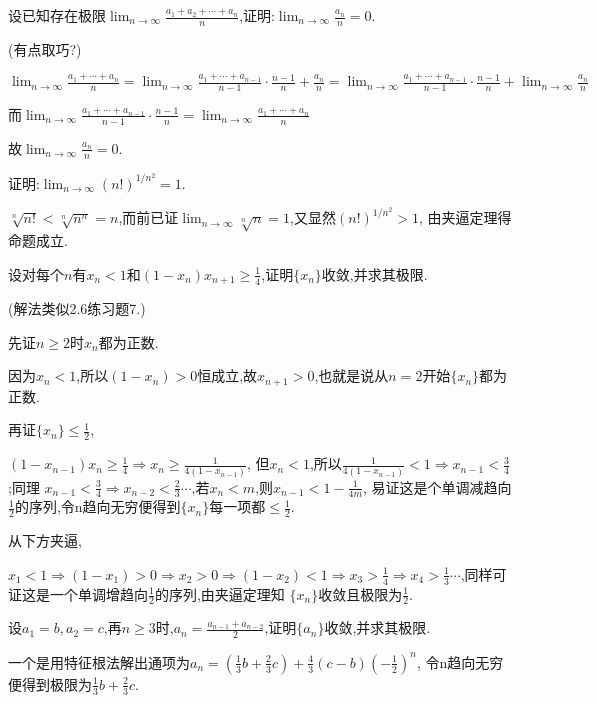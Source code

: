 \documentclass{exam}
\begin{document}
\begin{questions}
    \question
    设已知存在极限$\lim_{n\to\infty}\frac{a_1+a_2+\cdots+a_n}{n}$,证明:$\lim_{n\to\infty}\frac{a_n}{n}=0$.
    \begin{solution}
        (有点取巧?)

        $\lim_{n\to\infty}\frac{a_1+\cdots+a_n}{n}=
        \lim_{n\to\infty}\frac{a_1+\cdots+a_{n-1}}{n-1}\cdot\frac{n-1}{n}+\frac{a_n}{n}=
        \lim_{n\to\infty}\frac{a_1+\cdots+a_{n-1}}{n-1}\cdot\frac{n-1}{n}+\lim_{n\to\infty}\frac{a_n}{n}$

        而$\lim_{n\to\infty}\frac{a_1+\cdots+a_{n-1}}{n-1}\cdot\frac{n-1}{n}=\lim_{n\to\infty}\frac{a_1+\cdots+a_n}{n}$

        故$\lim_{n\to\infty}\frac{a_n}{n}=0$.
    \end{solution}

    \question
    证明:$\lim_{n\to\infty}(n!)^{1/n^2}=1$.
    \begin{solution}
        $\sqrt[n]{n!}<\sqrt[n]{n^n}=n$,而前已证$\lim_{n\to\infty}\sqrt[n]{n}=1$,又显然$(n!)^{1/n^2}>1$,
        由夹逼定理得命题成立.
    \end{solution}

    \question
    设对每个$n$有$x_n<1$和$(1-x_n)x_{n+1}\geqslant\frac{1}{4}$,证明$\{x_n\}$收敛,并求其极限.
    \begin{solution}
        (解法类似2.6练习题7.)
        
        先证$n\geqslant2$时$x_n$都为正数.

        因为$x_n<1$,所以$(1-x_n)>0$恒成立,故$x_{n+1}>0$,也就是说从$n=2$开始$\{x_n\}$都为正数.

        再证$\{x_n\}\leqslant\frac{1}{2}$,

        $(1-x_{n-1})x_n\geqslant\frac{1}{4}\Rightarrow x_n\geqslant\frac{1}{4(1-x_{n-1})}$,
        但$x_n<1$,所以$\frac{1}{4(1-x_{n-1})}<1\Rightarrow x_{n-1}<\frac{3}{4}$;同理
        $x_{n-1}<\frac{3}{4}\Rightarrow x_{n-2}<\frac{2}{3}\cdots$,若$x_n<m$,则$x_{n-1}<1-\frac{1}{4m}$,
        易证这是个单调减趋向$\frac{1}{2}$的序列,令n趋向无穷便得到$\{x_n\}$每一项都$\leqslant\frac{1}{2}$.

        从下方夹逼,
        
        $x_1<1\Rightarrow(1-x_1)>0\Rightarrow x_2>0\Rightarrow(1-x_2)<1\Rightarrow x_3>\frac{1}{4}
        \Rightarrow x_4>\frac{1}{3}\cdots$,同样可证这是一个单调增趋向$\frac{1}{2}$的序列,由夹逼定理知
        $\{x_n\}$收敛且极限为$\frac{1}{2}$.
    \end{solution}

    \question
    设$a_1=b,a_2=c$,再$n\geqslant3$时,$a_n=\frac{a_{n-1}+a_{n-2}}{2}$,证明$\{a_n\}$收敛,并求其极限.
    \begin{solution}
        一个是用特征根法解出通项为$a_n=(\frac{1}{3}b+\frac{2}{3}c)+\frac{4}{3}(c-b)(-\frac{1}{2})^n$,
        令n趋向无穷便得到极限为$\frac{1}{3}b+\frac{2}{3}c$.
    \end{solution}

\end{questions}
\end{document}
